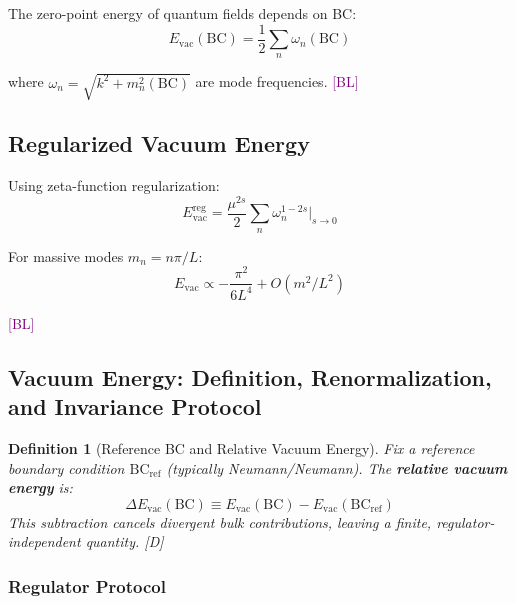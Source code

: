 \documentclass[11pt,a4paper]{article}
\newtheorem{definition}[theorem]{Definition}
\newcommand{\tagD}{\textcolor{blue!70!black}{[D]}}
\newcommand{\tagBL}{\textcolor{purple}{[BL]}}
\begin{document}
The zero-point energy of quantum fields depends on BC:
\begin{equation}
\label{eq:casimir}
E_{\text{vac}}(\text{BC}) = \frac{1}{2} \sum_n \omega_n(\text{BC})
\end{equation}

where $\omega_n = \sqrt{k^2 + m_n^2(\text{BC})}$ are mode frequencies. \tagBL

\subsection{Regularized Vacuum Energy}

Using zeta-function regularization:
\begin{equation}
\label{eq:casimir-zeta}
E_{\text{vac}}^{\text{reg}} = \frac{\mu^{2s}}{2} \sum_n \omega_n^{1-2s} \bigg|_{s \to 0}
\end{equation}

For massive modes $m_n = n\pi/L$:
\begin{equation}
\label{eq:casimir-massive}
E_{\text{vac}} \propto -\frac{\pi^2}{6L^4} + O(m^2/L^2)
\end{equation}

\tagBL

\subsection{Vacuum Energy: Definition, Renormalization, and Invariance Protocol}
\label{sec:vac-protocol}

\begin{definition}[Reference BC and Relative Vacuum Energy]
\label{def:delta-E}
Fix a reference boundary condition $\text{BC}_{\text{ref}}$ (typically Neumann/Neumann).
The \textbf{relative vacuum energy} is:
\begin{equation}
\label{eq:delta-E-def}
\boxed{\Delta E_{\text{vac}}(\text{BC}) \equiv E_{\text{vac}}(\text{BC}) - E_{\text{vac}}(\text{BC}_{\text{ref}})}
\end{equation}
This subtraction cancels divergent bulk contributions, leaving a finite,
regulator-independent quantity. \tagD
\end{definition}

\subsubsection{Regulator Protocol}
\end{document}
